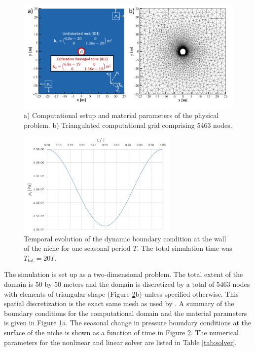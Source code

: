 \begin{figure}
\includegraphics[width=\textwidth, trim=0.4cm 0 0 0, clip]{./figures/MEX10_setup_and_grid.png}
\caption{a) Computational setup and material parameters of the physical problem. b) Triangulated computational grid comprising 5463 nodes. }
\label{fig:setup}
\end{figure}

\begin{figure}
\centering
\includegraphics[width=0.7\textwidth]{./figures/MEX10_boundary_condition_tunnel.png}
\caption{Temporal evolution of the dynamic boundary condition at the wall of the niche for one seasonal period $T$. The total simulation time was ${T_\text{tot}=20T}$.}
\label{fig:bc}
\end{figure}

The simulation is set up as a two-dimensional problem. The total extent of the domain is 50 by 50 meters and the domain is discretized by a total of 5463 nodes with elements of triangular shape (Figure \ref{fig:bc}b) unless specified otherwise. This spatial discretization is the exact same mesh as used by \cite{ziefle2018}. A summary of the boundary conditions for the computational domain and the material parameters is given in Figure \ref{fig:setup}a. The seasonal change in pressure boundary conditions at the surface of the niche is shown as a function of time in Figure \ref{fig:bc}. The numerical parameters for the nonlinear and linear solver are listed in Table \ref{tab:solver}.


